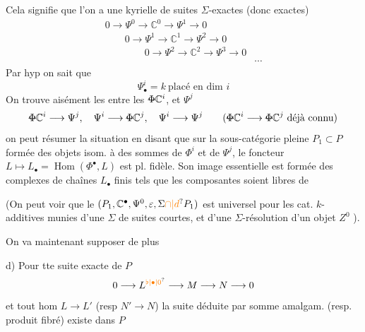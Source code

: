 Cela signifie que l'on a une kyrielle de suites $\Sigma$-exactes (donc exactes)
\[
\begin{aligned}
0\longrightarrow\Psi^0\longrightarrow \mathbb{C}^0\longrightarrow\Psi^1\longrightarrow0&\\
\hspace{2em}0\longrightarrow\Psi^1\longrightarrow \mathbb{C}^1\longrightarrow\Psi^2\longrightarrow0&\\
\hspace{4em}0\longrightarrow\Psi^2\longrightarrow \mathbb{C}^2\longrightarrow\Psi^3\longrightarrow0&\\
&\cdots
\end{aligned}
\]
Par hyp on sait que
\[
\Psi^i_{\bullet}=k\ \text{placé en dim }i
\]
On trouve aisément les   entre les $\deleted{\Phi}\mathbb{C}^i$, et  $\Psi^j$
\[
\deleted{\Phi}\mathbb{C}^i\longrightarrow\Psi^j,\quad\Psi^i\longrightarrow\deleted{\Phi}\mathbb{C}^j,\quad\Psi^i\longrightarrow\Psi^j\qquad(\deleted{\Phi}\mathbb{C}^i\longrightarrow\deleted{\Phi}\mathbb{C}^j\ \text{déjà connu})
\]
on peut résumer la situation en disant que sur la sous-catégorie pleine $P_1\subset P$ formée des objets isom. à des sommes de $\Phi^i$ et de $\Psi^j$, le foncteur $L\longmapsto L_{\bullet}=\operatorname{Hom}(\Phi^{\bullet},L)$ est pl. fidèle. Son image essentielle est formée des complexes de chaînes $L_{\bullet}$ finis tels que les composantes   soient libres de 

(On peut voir que le   $(P_1,\mathbb{C}^{\bullet},\Psi^0,\varepsilon,\Sigma\unsure{\cap|d}P_1)$ est universel pour les cat. $k$-additives munies d'une   $\Sigma$ de suites courtes, et d'une $\Sigma$-résolution d'un objet $Z^0$ \unsure{--|\ldots}).

On va maintenant supposer de plus

d) Pour tte suite \inserted{$\Sigma$-}exacte de $P$
\[
0\longrightarrow L^{\unsure{\flat|\bullet|0}}\longrightarrow M\longrightarrow N\longrightarrow0
\]
et tout hom $L\longrightarrow L'$ (resp $N'\longrightarrow N$) la suite  déduite par somme amalgam. (resp. produit fibré) existe dans $P$

